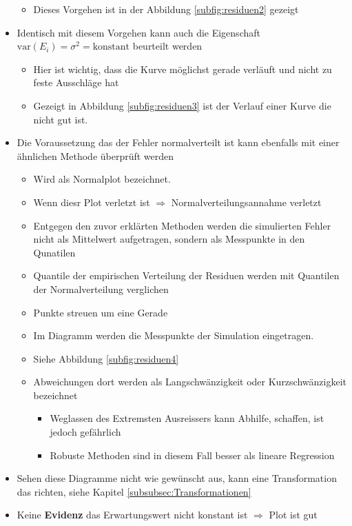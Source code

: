 \begin{itemize}
\begin{itemize}
		\item Dieses Vorgehen ist in der Abbildung \ref{subfig:residuen2} gezeigt
	\end{itemize}
	\item Identisch mit diesem Vorgehen kann auch die Eigenschaft $\text{var}(E_i)=\sigma^2=\text{konstant}$ beurteilt werden
	\begin{itemize}
		\item Hier ist wichtig, dass die Kurve möglichst gerade verläuft und nicht zu feste Ausschläge hat
		\item Gezeigt in Abbildung \ref{subfig:residuen3} ist der Verlauf einer Kurve die nicht gut ist. 
	\end{itemize}
	\item Die Voraussetzung das der Fehler normalverteilt ist kann ebenfalls mit einer ähnlichen Methode überprüft werden
	\begin{itemize}
		\item Wird als Normalplot bezeichnet.
		\item Wenn diesr Plot verletzt ist $\Rightarrow$ Normalverteilungsannahme verletzt
		\item Entgegen den zuvor erklärten Methoden werden die simulierten Fehler nicht als Mittelwert aufgetragen, sondern als Messpunkte in den Qunatilen 
		\item Quantile der empirischen Verteilung der Residuen werden mit Quantilen der Normalverteilung verglichen
		\item Punkte streuen um eine Gerade
		\item Im Diagramm werden die Messpunkte der Simulation eingetragen. 
		\item Siehe Abbildung \ref{subfig:residuen4}
		\item Abweichungen dort werden als Langschwänzigkeit oder Kurzschwänzigkeit bezeichnet
		\begin{itemize}
			\item Weglassen des Extremsten Ausreissers kann Abhilfe, schaffen, ist jedoch gefährlich
			\item Robuste Methoden sind in diesem Fall besser als lineare Regression
		\end{itemize}
	\end{itemize}
	\item Sehen diese Diagramme nicht wie gewünscht aus, kann eine Transformation das richten, siehe Kapitel \ref{subsubsec:Transformationen}
	\item Keine \textbf{Evidenz} das Erwartungswert nicht konstant ist $\Rightarrow$ Plot ist gut
\end{itemize}
